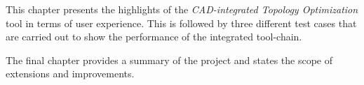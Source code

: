   \vspace{1mm}

\noindent This chapter presents the highlights of the \emph{CAD-integrated Topology Optimization} tool in terms of user experience. This is followed by three different test cases that are carried out to show the performance of the integrated tool-chain.
\\

  \vspace{1mm}

\noindent The final chapter provides a summary of the project and states the scope of extensions and improvements.


\begin{comment}
\\
\noindent {\scshape Chapter 4: Summary and future work}  \vspace{1mm}

\noindent The final chapter summarizes the current status of the project and enumerates objectives for the next phase. \todourgent{Check if consistent with what the Gods want. -Saumi}
\\
\end{comment}

